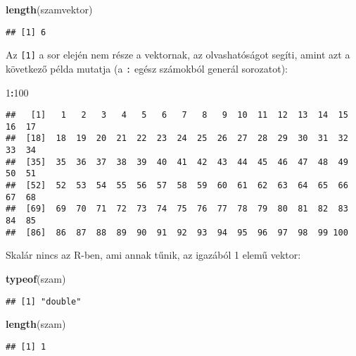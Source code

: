 \documentclass[]{book}
\newenvironment{Shaded}{\begin{snugshade}}{\end{snugshade}}
\newcommand{\DecValTok}[1]{\textcolor[rgb]{0.00,0.00,0.81}{#1}}
\newcommand{\KeywordTok}[1]{\textcolor[rgb]{0.13,0.29,0.53}{\textbf{#1}}}
\newcommand{\NormalTok}[1]{#1}
\newcommand{\OperatorTok}[1]{\textcolor[rgb]{0.81,0.36,0.00}{\textbf{#1}}}
\begin{document}
\begin{Shaded}
\begin{Highlighting}[]
\KeywordTok{length}\NormalTok{(szamvektor)}
\end{Highlighting}
\end{Shaded}

\begin{verbatim}
## [1] 6
\end{verbatim}

Az \texttt{{[}1{]}} a sor elején nem része a vektornak, az olvashatóságot segíti, amint azt a következő példa mutatja (a \texttt{:} egész számokból generál sorozatot):

\begin{Shaded}
\begin{Highlighting}[]
\DecValTok{1}\OperatorTok{:}\DecValTok{100}
\end{Highlighting}
\end{Shaded}

\begin{verbatim}
##   [1]   1   2   3   4   5   6   7   8   9  10  11  12  13  14  15  16  17
##  [18]  18  19  20  21  22  23  24  25  26  27  28  29  30  31  32  33  34
##  [35]  35  36  37  38  39  40  41  42  43  44  45  46  47  48  49  50  51
##  [52]  52  53  54  55  56  57  58  59  60  61  62  63  64  65  66  67  68
##  [69]  69  70  71  72  73  74  75  76  77  78  79  80  81  82  83  84  85
##  [86]  86  87  88  89  90  91  92  93  94  95  96  97  98  99 100
\end{verbatim}

Skalár nincs az R-ben, ami annak tűnik, az igazából 1 elemű vektor:

\begin{Shaded}
\begin{Highlighting}[]
\KeywordTok{typeof}\NormalTok{(szam)}
\end{Highlighting}
\end{Shaded}

\begin{verbatim}
## [1] "double"
\end{verbatim}

\begin{Shaded}
\begin{Highlighting}[]
\KeywordTok{length}\NormalTok{(szam)}
\end{Highlighting}
\end{Shaded}

\begin{verbatim}
## [1] 1
\end{verbatim}
\end{document}
